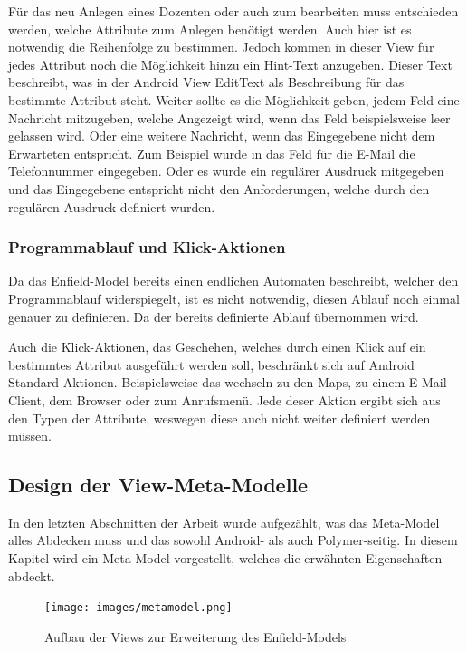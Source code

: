 Für das neu Anlegen eines Dozenten oder auch zum bearbeiten muss entschieden werden, welche Attribute zum Anlegen benötigt werden. Auch hier ist es notwendig die Reihenfolge zu bestimmen. Jedoch kommen in dieser View für jedes Attribut noch die Möglichkeit hinzu ein Hint-Text anzugeben. Dieser Text beschreibt, was in der Android View EditText als Beschreibung für das bestimmte Attribut steht. Weiter sollte es die Möglichkeit geben, jedem Feld eine Nachricht mitzugeben, welche Angezeigt wird, wenn das Feld beispielsweise leer gelassen wird. Oder eine weitere Nachricht, wenn das Eingegebene nicht dem Erwarteten entspricht. Zum Beispiel wurde in das Feld für die E-Mail die Telefonnummer eingegeben. Oder es wurde ein regulärer Ausdruck mitgegeben und das Eingegebene entspricht nicht den Anforderungen, welche durch den regulären Ausdruck definiert wurden.

\subsubsection{Programmablauf und Klick-Aktionen}

Da das Enfield-Model bereits einen endlichen Automaten beschreibt, welcher den Programmablauf widerspiegelt, ist es nicht notwendig, diesen Ablauf noch einmal genauer zu definieren. Da der bereits definierte Ablauf übernommen wird.

Auch die Klick-Aktionen, das Geschehen, welches durch einen Klick auf ein bestimmtes Attribut ausgeführt werden soll, beschränkt sich auf Android Standard Aktionen. Beispielsweise das wechseln zu den Maps, zu einem E-Mail Client, dem Browser oder zum Anrufsmenü. Jede deser Aktion ergibt sich aus den Typen der Attribute, weswegen diese auch nicht weiter definiert werden müssen.

\subsection{Design der View-Meta-Modelle} \label{sec:resourceViews}

In den letzten Abschnitten der Arbeit wurde aufgezählt, was das Meta-Model alles Abdecken muss und das sowohl Android- als auch Polymer-seitig. In diesem Kapitel wird ein Meta-Model vorgestellt, welches die erwähnten Eigenschaften abdeckt.


\begin{figure}[H]
	\begin{center}
		\texttt{[image: images/metamodel.png]}
		\caption{Aufbau der Views zur Erweiterung des Enfield-Models}
		\label{fig:meta-model}
	\end{center}
\end{figure}

